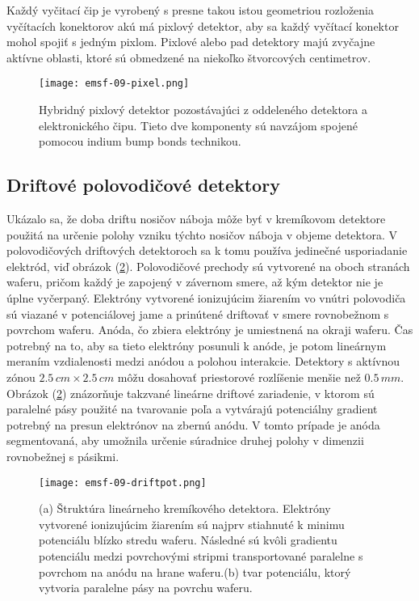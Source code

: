 \documentclass[../../main.tex]{subfiles}
\begin{document}
Každý vyčitací čip je vyrobený s presne takou istou geometriou rozloženia vyčítacích konektorov akú má pixlový detektor, aby sa každý vyčítací konektor mohol spojiť s jedným pixlom. Pixlové alebo pad detektory majú zvyčajne aktívne oblasti, ktoré sú obmedzené na niekoľko štvorcových centimetrov.

\begin{figure}[!h]
\texttt{[image: emsf-09-pixel.png]}
\centering
\caption{Hybridný pixlový detektor pozostávajúci z oddeleného detektora a elektronického čipu. Tieto dve komponenty sú navzájom spojené pomocou indium bump bonds technikou.}
\label{em9:fig:pixel}
\end{figure}

\subsection{Driftové polovodičové detektory}
Ukázalo sa, že doba driftu nosičov náboja môže byť v kremíkovom detektore použitá na určenie polohy vzniku týchto nosičov náboja v objeme detektora. V polovodičových driftových detektoroch sa k tomu používa jedinečné usporiadanie elektród, viď obrázok (\ref{em9:fig:drift}). Polovodičové prechody sú vytvorené na oboch stranách waferu, pričom každý je zapojený v závernom smere, až kým detektor nie je úplne vyčerpaný. Elektróny vytvorené ionizujúcim žiarením vo vnútri polovodiča sú viazané v potenciálovej jame a prinútené driftovať v smere rovnobežnom s povrchom waferu. Anóda, čo zbiera elektróny je umiestnená na okraji waferu. Čas potrebný na to, aby sa tieto elektróny posunuli k anóde, je potom lineárnym meraním vzdialenosti medzi anódou a polohou interakcie. Detektory s aktívnou zónou $2.5\,\unit{cm} \times 2.5\,\unit{cm}$ môžu dosahovať priestorové rozlíšenie menšie než $0.5\,\unit{mm}$. Obrázok (\ref{em9:fig:drift}) znázorňuje takzvané lineárne driftové zariadenie, v ktorom sú paralelné pásy použité na tvarovanie poľa a vytvárajú potenciálny gradient potrebný na presun elektrónov na zbernú anódu. V tomto prípade je anóda segmentovaná, aby umožnila určenie súradnice druhej polohy v dimenzii rovnobežnej s pásikmi.

\begin{figure}[!h]
\texttt{[image: emsf-09-driftpot.png]}
\centering
\caption{(a) Štruktúra lineárneho kremíkového detektora. Elektróny vytvorené ionizujúcim žiarením sú najprv stiahnuté k minimu potenciálu blízko stredu waferu. Následné sú kvôli gradientu potenciálu medzi povrchovými stripmi transportované paralelne s povrchom na anódu na hrane waferu.(b) tvar potenciálu, ktorý vytvoria paralelne pásy na povrchu waferu.}
\label{em9:fig:drift}
\end{figure}
\end{document}

